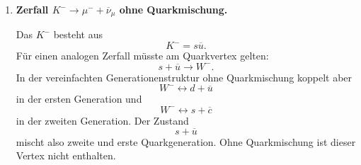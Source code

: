 \documentclass[11pt,a4paper]{scrartcl}
\newcommand{\mum}{\mu^-}
\newcommand{\numub}{\overline{\nu}_\mu}
\newcommand{\pionm}{\pi^-}
\newcommand{\kaonm}{K^-}
\theoremstyle{definition}
\theoremstyle{plain}
\theoremstyle{remark}
\begin{document}
\begin{enumerate}[label=(\alph*)]
    \begin{calculationbox}
        Das $\pi^-$ besteht im Quarkmodell aus
        \[
            \pionm = d\overline u.
        \]
        Die beiden Konstituenten können über den geladenen schwachen Strom annihilieren:
        \[
            d+\overline u \to W^-.
        \]
        Anschließend zerfällt das virtuelle $W^-$ in ein Myon und ein Myon-Antineutrino:
        \[
            W^- \to \mu^-+\overline{\nu}_\mu.
        \]
        Insgesamt ergibt sich:
        \[
            \pionm(d\overline u)\to W^- \to \mu^-+\overline{\nu}_\mu.
        \]
    \end{calculationbox}

    \begin{calculationbox}[title=Feynman-Diagramm]
    \begin{center}
    \end{center}
    \end{calculationbox}

    \begin{answerbox}
        Ja, der Zerfall lässt sich direkt darstellen:
        \[
            \boxed{\pionm(d\overline u)\to W^-\to\mu^-+\overline{\nu}_\mu.}
        \]
    \end{answerbox}

    \item \textbf{Zerfall $\kaonm\to\mum+\numub$ ohne Quarkmischung.}

    \begin{calculationbox}
        Das $K^-$ besteht aus
        \[
            K^- = s\overline u.
        \]
        Für einen analogen Zerfall müsste am Quarkvertex gelten:
        \[
            s+\overline u\to W^-.
        \]
        In der vereinfachten Generationenstruktur ohne Quarkmischung koppelt aber
        \[
            W^- \leftrightarrow d+\overline u
        \]
        in der ersten Generation und
        \[
            W^- \leftrightarrow s+\overline c
        \]
        in der zweiten Generation.
        Der Zustand
        \[
            s+\overline u
        \]
        mischt also zweite und erste Quarkgeneration. Ohne Quarkmischung ist dieser Vertex nicht enthalten.
    \end{calculationbox}


\end{enumerate}
\end{document}
